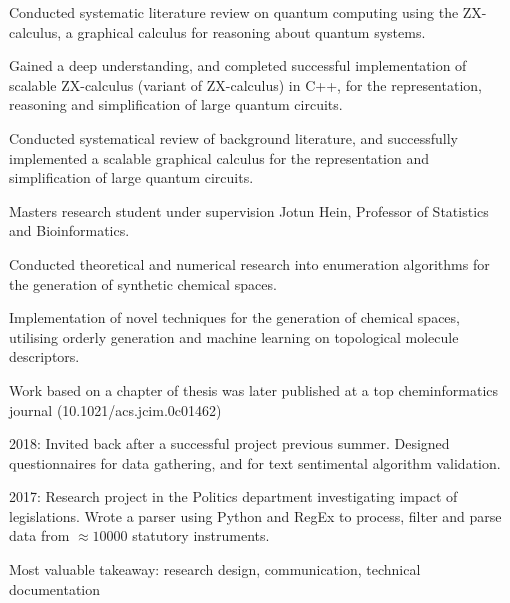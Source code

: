 \documentclass[]{deedy-resume-openfont}
\begin{document}
\hfill {}
\begin{tightemize}
    \item Conducted systematic literature review on quantum computing using the ZX-calculus, a graphical calculus for reasoning about quantum systems.
    \item Gained a deep understanding, and completed successful implementation of scalable ZX-calculus (variant of ZX-calculus) in C++, for the representation, reasoning and simplification of large quantum circuits.
	\item Conducted systematical review of background literature, and successfully implemented a scalable graphical calculus for the representation and simplification of large quantum circuits.
\end{tightemize}
\sectionsep

\hfill {}
\begin{tightemize}
    \item Masters research student under supervision Jotun Hein, Professor of Statistics and Bioinformatics.
    \item Conducted theoretical and numerical research into enumeration algorithms for the generation of synthetic chemical spaces.
    \item Implementation of novel techniques for the generation of chemical spaces, utilising orderly generation and machine learning on topological molecule descriptors.
    \item Work based on a chapter of thesis was later published at a top cheminformatics journal (10.1021/acs.jcim.0c01462)
\end{tightemize}
\sectionsep

\hfill {}
\begin{tightemize}
	\item 2018: Invited back after a successful project previous summer. Designed questionnaires for data gathering, and for text sentimental algorithm validation.
	\item 2017: Research project in the Politics department investigating impact of legislations. Wrote a parser using Python and RegEx to process, filter and parse data from $\approx 10000$ statutory instruments. 
	\item Most valuable takeaway: research design, communication, technical documentation
\end{tightemize}
\sectionsep
\end{document}
